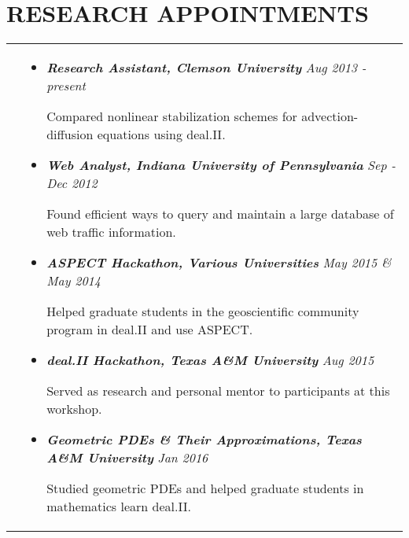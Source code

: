 \documentclass[10pt]{article}
\begin{document}
\section{\textbf{RESEARCH APPOINTMENTS}}
\vspace*{-\baselineskip}
\hskip-1.7in
\begin{tabularx}{1.5\linewidth}{>{\raggedleft\scshape}p{3cm}X}

  &\begin{itemize}
    \setlength\itemsep{.005em}
  \item \textbf{\textit{Research Assistant, Clemson University}}    \hspace{50 mm}\textit{Aug 2013 - present}

	Compared nonlinear stabilization schemes for advection-diffusion equations using deal.II.        
             
\item \textbf{\textit{Web Analyst, Indiana University of Pennsylvania}} \hspace{33 mm}\textit{Sep - Dec 2012}
  
        Found efficient ways to query and maintain a large database of web traffic information.
             
\item \textbf{\textit{ASPECT Hackathon, Various Universities}} \hspace{46 mm}\textit{May 2015 \& May 2014}
  
            
            Helped graduate students in the geoscientific community program in deal.II and use ASPECT.
             
\item \textbf{\textit{deal.II Hackathon, Texas A\&M University}} \hspace{46 mm}\textit{Aug 2015}
  
            Served as research and personal mentor to participants at this workshop.
            
            \item \textbf{\textit{Geometric PDEs \& Their Approximations, Texas A\&M University}} \hspace{2.5 mm}\textit{Jan 2016}
  
            Studied geometric PDEs and helped graduate students in mathematics learn deal.II.
             
  \end{itemize} 

\end{tabularx}
 
\end{document}
